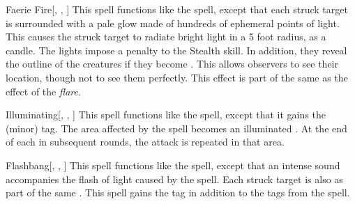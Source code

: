 \lowercase{\hypertarget{spell:Faerie Fire}{}}\label{spell:Faerie Fire}
\begin{freeability}[Rank 3]{\hypertarget{spell:Faerie Fire}{Faerie Fire}}[, , ]
This spell functions like the  spell, except that each struck target is surrounded with a pale glow made of hundreds of ephemeral points of light.
This causes the struck target to radiate bright light in a 5 foot radius, as a candle.
The lights impose a  penalty to the Stealth skill.
In addition, they reveal the outline of the creatures if they become .
This allows observers to see their location, though not to see them perfectly.
This effect is part of the same  as the effect of the \textit{flare}.
\end{freeability}
\vspace{0.25em}



\lowercase{\hypertarget{spell:Illuminating}{}}\label{spell:Illuminating}
\begin{freeability}[Rank 3]{\hypertarget{spell:Illuminating}{Illuminating}}[, , ]
This spell functions like the  spell, except that it gains the  (minor) tag.
The area affected by the spell becomes an illuminated .
At the end of each  in subsequent rounds, the attack is repeated in that area.
\end{freeability}
\vspace{0.25em}



\lowercase{\hypertarget{spell:Flashbang}{}}\label{spell:Flashbang}
\begin{freeability}[Rank 4]{\hypertarget{spell:Flashbang}{Flashbang}}[, , ]
This spell functions like the  spell, except that an intense sound accompanies the flash of light caused by the spell.
Each struck target is also  as part of the same .
This spell gains the  tag in addition to the tags from the  spell.
\end{freeability}
\vspace{0.25em}



